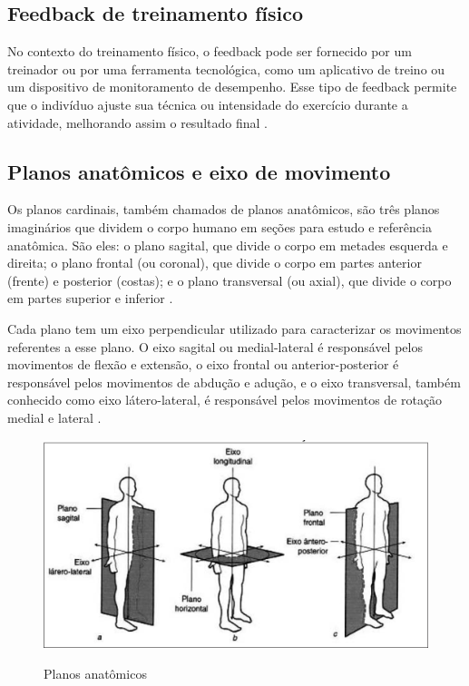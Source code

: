 \subsection[Feedback de treinamento físico]{Feedback de treinamento físico}


No contexto do treinamento físico, o feedback pode ser fornecido por um treinador ou por uma ferramenta tecnológica, como um aplicativo de treino ou um dispositivo de monitoramento de desempenho. Esse tipo de feedback permite que o indivíduo ajuste sua técnica ou intensidade do exercício durante a atividade, melhorando assim o resultado final \cite{feedback}.




\subsection[Planos anatômicos e eixo de movimento]{Planos anatômicos e eixo de movimento}

Os planos cardinais, também chamados de planos anatômicos, são três planos imaginários que dividem o corpo humano em seções para estudo e referência anatômica. São eles: o plano sagital, que divide o corpo em metades esquerda e direita; o plano frontal (ou coronal), que divide o corpo em partes anterior (frente) e posterior (costas); e o plano transversal (ou axial), que divide o corpo em partes superior e inferior \cite{cinesiologia}.

Cada plano tem um eixo perpendicular utilizado para caracterizar os movimentos referentes a esse plano. O eixo sagital ou medial-lateral é responsável pelos movimentos de flexão e extensão, o eixo frontal ou anterior-posterior é responsável pelos movimentos de abdução e adução, e o eixo transversal, também conhecido como eixo látero-lateral, é responsável pelos movimentos de rotação medial e lateral \cite{cinesiologia}.


\begin{figure}[!htb]
	\centering
    \caption{Planos anatômicos}
	\includegraphics[scale=0.15]{figuras/TAF/planos.png}
	\label{fig:Planos anatomicos}
\end{figure}


